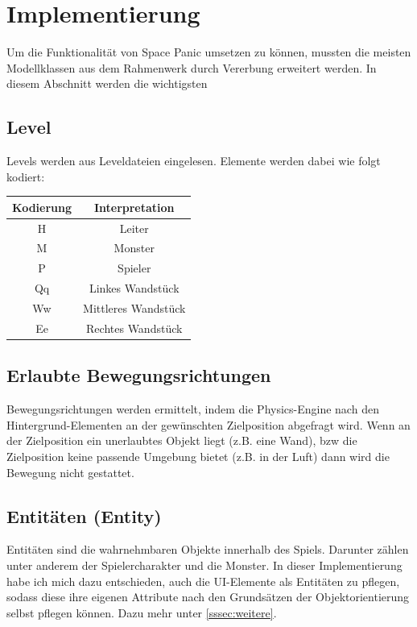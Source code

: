 \documentclass[12pt]{article}
\begin{document}

\section{Implementierung}
Um die Funktionalität von Space Panic umsetzen zu können, mussten die meisten Modellklassen aus dem Rahmenwerk durch Vererbung erweitert werden. In diesem Abschnitt werden die wichtigsten 

\subsection{Level}
	Levels werden aus Leveldateien eingelesen. Elemente werden dabei wie folgt kodiert:
	\begin{tabular}{|c|c|}
			\hline
			Kodierung & Interpretation \\ 
			\hline
			\hline 
			H & Leiter \\ 
			\hline 
			M & Monster \\ 
			\hline 
			P & Spieler \\ 
			\hline 
			Qq & Linkes Wandstück \\ 
			\hline 
			Ww & Mittleres Wandstück \\ 
			\hline 
			Ee & Rechtes Wandstück \\ 
			\hline 
	\end{tabular}
	
\subsection{Erlaubte Bewegungsrichtungen}	
Bewegungsrichtungen werden ermittelt, indem die Physics-Engine nach den Hintergrund-Elementen an der gewünschten Zielposition abgefragt wird. Wenn an der Zielposition ein unerlaubtes Objekt liegt (z.B. eine Wand), bzw die Zielposition keine passende Umgebung bietet (z.B. in der Luft) dann wird die Bewegung nicht gestattet.

\subsection{Entitäten (Entity)}
	Entitäten sind die wahrnehmbaren Objekte innerhalb des Spiels. Darunter zählen unter anderem der Spielercharakter und die Monster. In dieser Implementierung habe ich mich dazu entschieden, auch die UI-Elemente als Entitäten zu pflegen, sodass diese ihre eigenen Attribute nach den Grundsätzen der Objektorientierung selbst pflegen können. Dazu mehr unter \ref{sssec:weitere}.
\end{document}
